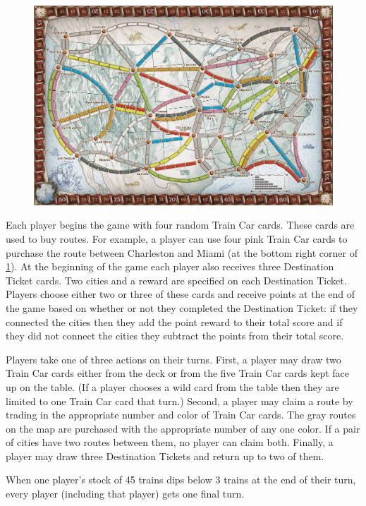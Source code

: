 \begin{figure}[H]
\centering
\includegraphics[scale=.2]{figures/board}
\label{fig:board}
\end{figure}

Each player begins the game with four random Train Car cards.
These cards are used to buy routes.
For example, a player can use four pink Train Car cards to purchase
the route between Charleston and Miami
(at the bottom right corner of \cref{fig:board}).
At the beginning of the game 
each player also receives three Destination Ticket cards.
Two cities and a reward are specified on each Destination Ticket.
Players choose either two or three of these cards and
receive points at the end of the game based on whether
or not they completed the Destination Ticket:
if they connected the cities then they add the point reward to their
total score and
if they did not connect the cities they subtract the points from their
total score.

Players take one of three actions on their turns.
First, a player may draw two Train Car cards either
from the deck or from the five Train Car cards
kept face up on the table. 
(If a player chooses a wild card from the table
then they are limited to one Train Car card that turn.)
Second, a player may claim a route by trading in
the appropriate number and color of Train Car cards.
The gray routes on the map are purchased with
the appropriate number of any one color.
If a pair of cities have two routes between them,
no player can claim both.
Finally, a player may draw three Destination Tickets
and return up to two of them.

When one player's stock of 45 trains dips below 3 trains at the end of their turn,
every player (including that player) gets one final turn.

